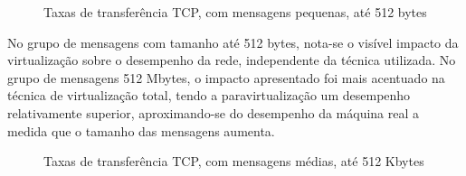 \documentclass[times, 10pt,twocolumn]{article}
\begin{document}
\begin{figure}[!htb]
\centering
{}
\caption{Taxas de transferência TCP, com mensagens pequenas, até 512 bytes}
\label{fig:tcpp}
\end{figure}

No grupo de mensagens com tamanho até 512 bytes, nota-se  o visível impacto da 
virtualização sobre o desempenho da rede, independente da técnica utilizada. No 
grupo de mensagens 512 Mbytes, o impacto apresentado foi  mais acentuado na 
técnica de virtualização total, tendo a paravirtualização um desempenho relativamente 
superior, aproximando-se do desempenho da máquina real a medida que o tamanho das 
mensagens aumenta.

\begin{figure}[!htb]
\centering
{}
\caption{Taxas de transferência TCP, com mensagens médias, até 512 Kbytes}
\label{fig:tcpm}
\end{figure}
\end{document}
